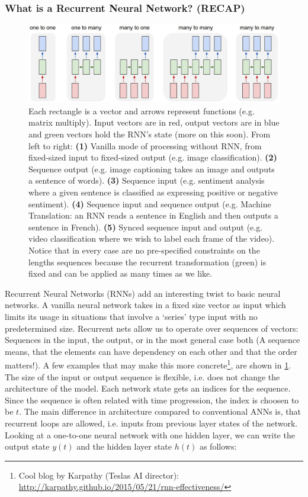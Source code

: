 \documentclass[main]{subfiles}
\begin{document}
\subsubsection{What is a Recurrent Neural Network? (RECAP)}
\begin{figure}[H]
    \centering
    \includegraphics[width=0.99\linewidth]{13_LearningInRecurrentNeuronalNetworks/figures/onetomany.png}
    \caption{Each rectangle is a vector and arrows represent functions (e.g. matrix multiply). Input vectors are in red, output vectors are in blue and green vectors hold the RNN's state (more on this soon). From left to right: \textbf{(1)} Vanilla mode of processing without RNN, from fixed-sized input to fixed-sized output (e.g. image classification). \textbf{(2)} Sequence output (e.g. image captioning takes an image and outputs a sentence of words). \textbf{(3)} Sequence input (e.g. sentiment analysis where a given sentence is classified as expressing positive or negative sentiment). \textbf{(4)} Sequence input and sequence output (e.g. Machine Translation: an RNN reads a sentence in English and then outputs a sentence in French). \textbf{(5)} Synced sequence input and output (e.g. video classification where we wish to label each frame of the video). Notice that in every case are no pre-specified constraints on the lengths sequences because the recurrent transformation (green) is fixed and can be applied as many times as we like.}
    \label{fig:onetomany}
\end{figure}


Recurrent Neural Networks (RNNs) add an interesting twist to basic neural networks. A vanilla neural network takes in a fixed size vector as input which limits its usage in situations that involve a ‘series’ type input with no predetermined size. Recurrent nets allow us to operate over sequences of vectors: Sequences in the input, the output, or in the most general case both (A sequence means, that the elements can have dependency on each other and that the order matters!). A few examples that may make this more concrete\footnote{Cool blog by Karpathy (Teslas AI director): \url{http://karpathy.github.io/2015/05/21/rnn-effectiveness/}}, are shown in \cref{fig:onetomany}. The size of the input or output sequence is flexible, i.e. does not change the architecture of the model. Each network state gets an indices for the sequence. Since the sequence is often related with time progression, the index is choosen to be $t$. The main difference in architecture compared to conventional ANNs is, that recurrent loops are allowed, i.e. inputs from previous layer states of the network. Looking at a one-to-one neural network with one hidden layer, we can write the output state $y(t)$ and the hidden layer state $h(t)$ as follows:
\end{document}

